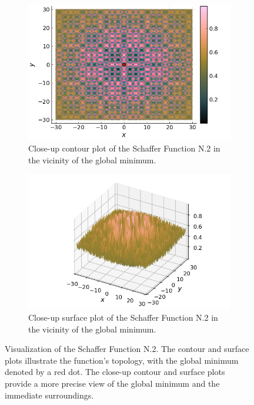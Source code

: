 \begin{figure}[ht!]
\begin{subfigure}[b]{0.45\textwidth}
      \includegraphics[width=\textwidth]
        {img/test_functions/schaffer_2_closeup_contour.png}
      \caption{
        Close-up contour plot of the Schaffer Function N.2 in the vicinity of
        the global minimum.
      }
    \end{subfigure}
    \hfill
    \begin{subfigure}[b]{0.45\textwidth}
      \centering
      \includegraphics[width=\textwidth]
        {img/test_functions/schaffer_2_closeup_surface.png}
      \caption{
        Close-up surface plot of the Schaffer Function N.2 in the vicinity of
        the global minimum.
      }
    \end{subfigure}
    \caption{
      Visualization of the Schaffer Function N.2.
      The contour and surface plots illustrate the function's topology, with the
      global minimum denoted by a red dot.
      The close-up contour and surface plots provide a more precise view of the 
      global minimum and the immediate surroundings.
    }
    \label{fig:app:test:schaffer_2}
  \end{figure}